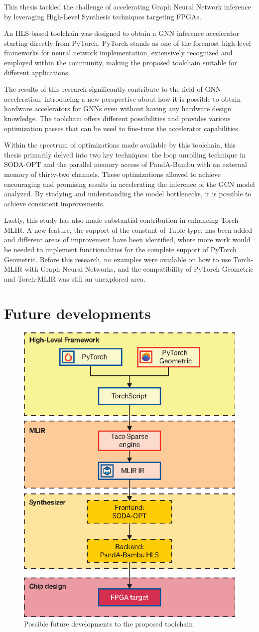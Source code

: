 This thesis tackled the challenge of accelerating Graph Neural Network inference by leveraging High-Level Synthesis techniques targeting FPGAs.

An HLS-based toolchain was designed to obtain a GNN inference accelerator starting directly from PyTorch.
PyTorch stands as one of the foremost high-level frameworks for neural network implementation, extensively recognized and employed within the community, making the proposed toolchain suitable for different applications.

The results of this research significantly contribute to the field of GNN acceleration, introducing a new perspective about how it is possible to obtain hardware accelerators for GNNs even without having any hardware design knowledge.
The toolchain offers different possibilities and provides various optimization passes that can be used to fine-tune the accelerator capabilities.

Within the spectrum of optimizations made available by this toolchain, this thesis primarily delved into two key techniques: the loop unrolling technique in SODA-OPT and the parallel memory access of PandA-Bambu with an external memory of thirty-two channels.
These optimizations allowed to achieve encouraging and promising results in accelerating the inference of the GCN model analyzed.
By studying and understanding the model bottlenecks, it is possible to achieve consistent improvements.

Lastly, this study has also made substantial contribution in enhancing Torch-MLIR\@.
A new feature, the support of the constant of Tuple type, has been added and different areas of improvement have been identified, where more work would be needed to implement functionalities for the complete support of PyTorch Geometric.
Before this research, no examples were available on how to use Torch-MLIR with Graph Neural Networks, and the compatibility of PyTorch Geometric and Torch-MLIR was still an unexplored area.

\section{Future developments}
\label{sec:future-dev}%

\begin{figure}[t]
    \centering
    \includegraphics[height=0.5\textwidth]{Images/toolchain_future}
    \caption{Possible future developments to the proposed toolchain}
    \label{fig:toolchain-future}
\end{figure}

